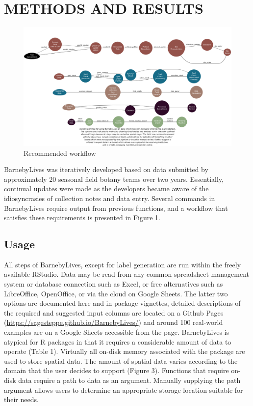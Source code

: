 \documentclass[
]{article}
\begin{document}
\section{METHODS AND RESULTS}\label{methods-and-results}

\begin{figure}
\centering
\includegraphics[width=1\textwidth,height=\textheight]{../graphics/plots/workflow.png}
\caption{Recommended workflow}
\end{figure}

BarnebyLives was iteratively developed based on data submitted by
approximately 20 seasonal field botany teams over two years.
Essentially, continual updates were made as the developers became aware
of the idiosyncrasies of collection notes and data entry. Several
commands in BarnebyLives require output from previous functions, and a
workflow that satisfies these requirements is presented in Figure 1.

\subsection{Usage}\label{usage}

All steps of BarnebyLives, except for label generation are run within
the freely available RStudio. Data may be read from any common
spreadsheet management system or database connection such as Excel, or
free alternatives such as LibreOffice, OpenOffice, or via the cloud on
Google Sheets. The latter two options are documented here and in package
vignettes, detailed descriptions of the required and suggested input
columns are located on a Github Pages
(\url{https://sagesteppe.github.io/BarnebyLives/}) and around 100
real-world examples are on a Google Sheets accessible from the page.
BarnebyLives is atypical for R packages in that it requires a
considerable amount of data to operate (Table 1). Virtually all on-disk
memory associated with the package are used to store spatial data. The
amount of spatial data varies according to the domain that the user
decides to support (Figure 3). Functions that require on-disk data
require a path to data as an argument. Manually supplying the path
argument allows users to determine an appropriate storage location
suitable for their needs.
\end{document}
